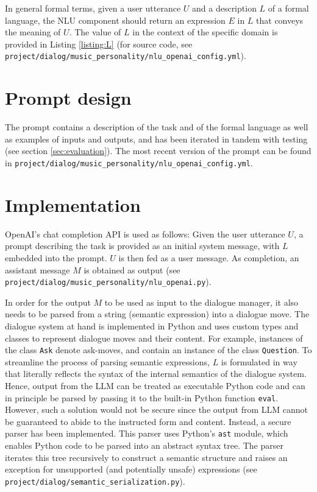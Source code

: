 \documentclass[11pt]{article}
\begin{document}
In general formal terms, given a user utterance $U$ and a description $L$ of a formal language, the NLU component should return an expression $E$ in $L$ that conveys the meaning of $U$. The value of $L$ in the context of the specific domain is provided in Listing \ref{listing:L} (for source code, see \texttt{project/dialog/music\_personality/nlu\_openai\_config.yml}).



\section{Prompt design}
The prompt contains a description of the task and of the formal language as well as examples of inputs and outputs, and has been iterated in tandem with testing (see section \ref{sec:evaluation}). The most recent version of the prompt can be found in \texttt{project/dialog/music\_personality/nlu\_openai\_config.yml}.

\section{Implementation}
OpenAI's chat completion API is used as follows: Given the user utterance $U$, a prompt describing the task is provided as an initial system message, with $L$ embedded into the prompt. $U$ is then fed as a user message. As completion, an assistant message $M$ is obtained as output (see \texttt{project/dialog/music\_personality/nlu\_openai.py}). 

In order for the output $M$ to be used as input to the dialogue manager, it also needs to be parsed from a string (semantic expression) into a dialogue move. The dialogue system at hand is implemented in Python and uses custom types and classes to represent dialogue moves and their content. For example, instances of the class \texttt{Ask} denote ask-moves, and contain an instance of the class \texttt{Question}. To streamline the process of parsing semantic expressions, $L$ is formulated in way that literally reflects the syntax of the internal semantics of the dialogue system. Hence, output from the LLM can be treated as executable Python code and can in principle be parsed by passing it to the built-in Python function \texttt{eval}. However, such a solution would not be secure since the output from LLM cannot be guaranteed to abide to the instructed form and content. Instead, a secure parser has been implemented. This parser uses Python's \texttt{ast} module, which enables Python code to be parsed into an abstract syntax tree. The parser iterates this tree recursively to construct a semantic structure and raises an exception for unsupported (and potentially unsafe) expressions (see \texttt{project/dialog/semantic\_serialization.py}).
\end{document}
